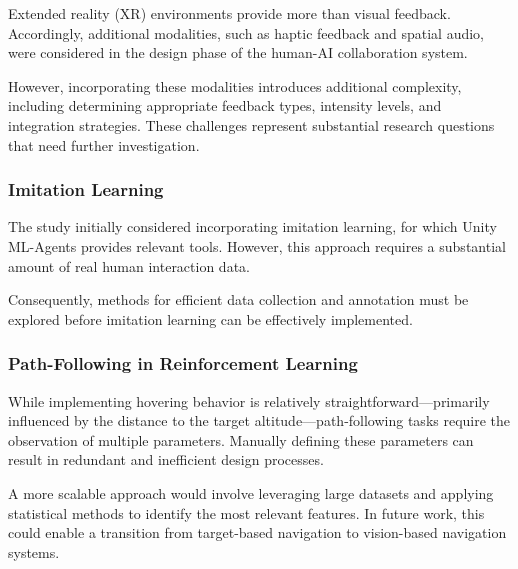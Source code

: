 Extended reality (XR) environments provide more than visual feedback. Accordingly, additional modalities, such as haptic feedback and spatial audio, were considered in the design phase of the human-AI collaboration system.

However, incorporating these modalities introduces additional complexity, including determining appropriate feedback types, intensity levels, and integration strategies. These challenges represent substantial research questions that need further investigation.

\subsubsection{Imitation Learning}

The study initially considered incorporating imitation learning, for which Unity ML-Agents provides relevant tools. However, this approach requires a substantial amount of real human interaction data.

Consequently, methods for efficient data collection and annotation must be explored before imitation learning can be effectively implemented.

\subsubsection{Path-Following in Reinforcement Learning}

While implementing hovering behavior is relatively straightforward—primarily influenced by the distance to the target altitude—path-following tasks require the observation of multiple parameters. Manually defining these parameters can result in redundant and inefficient design processes.

A more scalable approach would involve leveraging large datasets and applying statistical methods to identify the most relevant features. In future work, this could enable a transition from target-based navigation to vision-based navigation systems.